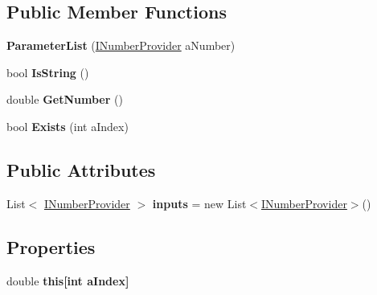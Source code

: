 \subsection*{Public Member Functions}
\begin{DoxyCompactItemize}
\item 
{\bfseries Parameter\+List} (\hyperlink{interface_b83_1_1_logic_expression_parser_1_1_i_number_provider}{I\+Number\+Provider} a\+Number)\hypertarget{class_b83_1_1_logic_expression_parser_1_1_parameter_list_a790521d76be9e494db2a6e6f9708ee71}{}\label{class_b83_1_1_logic_expression_parser_1_1_parameter_list_a790521d76be9e494db2a6e6f9708ee71}

\item 
bool {\bfseries Is\+String} ()\hypertarget{class_b83_1_1_logic_expression_parser_1_1_parameter_list_a7bd595587f65d85dbfab23faf4034917}{}\label{class_b83_1_1_logic_expression_parser_1_1_parameter_list_a7bd595587f65d85dbfab23faf4034917}

\item 
double {\bfseries Get\+Number} ()\hypertarget{class_b83_1_1_logic_expression_parser_1_1_parameter_list_a218a26616a81788cb8d6ab83dc870fcf}{}\label{class_b83_1_1_logic_expression_parser_1_1_parameter_list_a218a26616a81788cb8d6ab83dc870fcf}

\item 
bool {\bfseries Exists} (int a\+Index)\hypertarget{class_b83_1_1_logic_expression_parser_1_1_parameter_list_af92bb09a0ffa3efec25b12a0f5c913ac}{}\label{class_b83_1_1_logic_expression_parser_1_1_parameter_list_af92bb09a0ffa3efec25b12a0f5c913ac}

\end{DoxyCompactItemize}
\subsection*{Public Attributes}
\begin{DoxyCompactItemize}
\item 
List$<$ \hyperlink{interface_b83_1_1_logic_expression_parser_1_1_i_number_provider}{I\+Number\+Provider} $>$ {\bfseries inputs} = new List$<$\hyperlink{interface_b83_1_1_logic_expression_parser_1_1_i_number_provider}{I\+Number\+Provider}$>$()\hypertarget{class_b83_1_1_logic_expression_parser_1_1_parameter_list_a8341c4edb673478623b7b77628a126a1}{}\label{class_b83_1_1_logic_expression_parser_1_1_parameter_list_a8341c4edb673478623b7b77628a126a1}

\end{DoxyCompactItemize}
\subsection*{Properties}
\begin{DoxyCompactItemize}
\item 
double {\bfseries this\mbox{[}int a\+Index\mbox{]}}\hypertarget{class_b83_1_1_logic_expression_parser_1_1_parameter_list_a097f3b52b5db0735d8310b3e045aa55b}{}\label{class_b83_1_1_logic_expression_parser_1_1_parameter_list_a097f3b52b5db0735d8310b3e045aa55b}

\end{DoxyCompactItemize}


